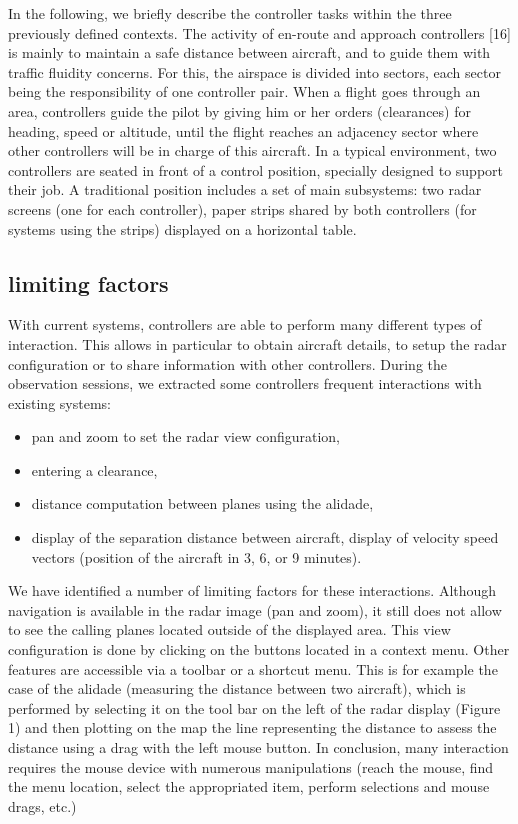 In the following, we briefly describe the controller tasks within the three previously defined contexts. The activity of en-route and approach controllers [16] is mainly to maintain a safe distance between aircraft, and to guide them with traffic fluidity concerns. For this, the airspace is divided into sectors, each sector being the responsibility of one controller pair. When a flight goes through an area, controllers guide
the pilot by giving him or her orders (clearances) for heading, speed or altitude, until the flight reaches an adjacency sector where other controllers will be in charge of
this aircraft. In a typical environment, two controllers are seated in front of a control position, specially designed to support their job. A traditional position includes a set of
main subsystems: two radar screens (one for each controller), paper strips shared by both controllers (for systems using the strips) displayed on a horizontal table.

\subsection{ limiting factors }

With current systems, controllers are able to perform many
different types of interaction. This allows in particular to
obtain aircraft details, to setup the radar configuration or to
share information with other controllers. During the
observation sessions, we extracted some controllers frequent
interactions with existing systems:
\begin{itemize}
\item pan and zoom to set the radar view configuration,
\item entering a clearance,
\item distance computation between planes using the alidade,
\item display of the separation distance between aircraft,
display of velocity speed vectors (position of the aircraft in
3, 6, or 9 minutes).
\end{itemize}

We have identified a number of limiting factors for these
interactions. Although navigation is available in the radar
image (pan and zoom), it still does not allow to see the
calling planes located outside of the displayed area. This
view configuration is done by clicking on the buttons located
in a context menu. Other features are accessible via a toolbar
or a shortcut menu. This is for example the case of the
alidade (measuring the distance between two aircraft), which
is performed by selecting it on the tool bar on the left of the
radar display (Figure 1) and then plotting on the map the line
representing the distance to assess the distance using a drag
with the left mouse button.
In conclusion, many interaction requires the mouse device with
numerous manipulations (reach the mouse, find the menu
location, select the appropriated item, perform selections and mouse drags, etc.)

